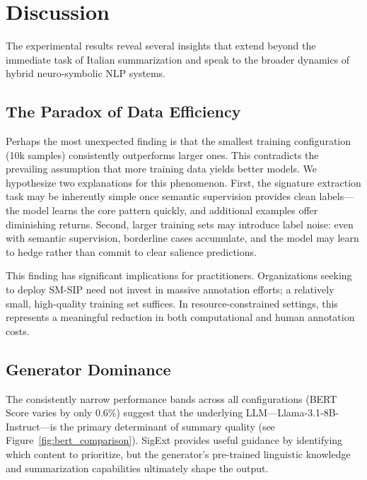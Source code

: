 \documentclass[conference]{IEEEtran}
\begin{document}
\section{Discussion}

The experimental results reveal several insights that extend beyond the immediate task of Italian summarization and speak to the broader dynamics of hybrid neuro-symbolic NLP systems.

\subsection{The Paradox of Data Efficiency}

Perhaps the most unexpected finding is that the smallest training configuration (10k samples) consistently outperforms larger ones. This contradicts the prevailing assumption that more training data yields better models. We hypothesize two explanations for this phenomenon. First, the signature extraction task may be inherently simple once semantic supervision provides clean labels---the model learns the core pattern quickly, and additional examples offer diminishing returns. Second, larger training sets may introduce label noise: even with semantic supervision, borderline cases accumulate, and the model may learn to hedge rather than commit to clear salience predictions.

This finding has significant implications for practitioners. Organizations seeking to deploy SM-SIP need not invest in massive annotation efforts; a relatively small, high-quality training set suffices. In resource-constrained settings, this represents a meaningful reduction in both computational and human annotation costs.

\subsection{Generator Dominance}

The consistently narrow performance bands across all configurations (BERT Score varies by only 0.6\%) suggest that the underlying LLM---Llama-3.1-8B-Instruct---is the primary determinant of summary quality (see Figure~\ref{fig:bert_comparison}). SigExt provides useful guidance by identifying which content to prioritize, but the generator's pre-trained linguistic knowledge and summarization capabilities ultimately shape the output.
\end{document}
